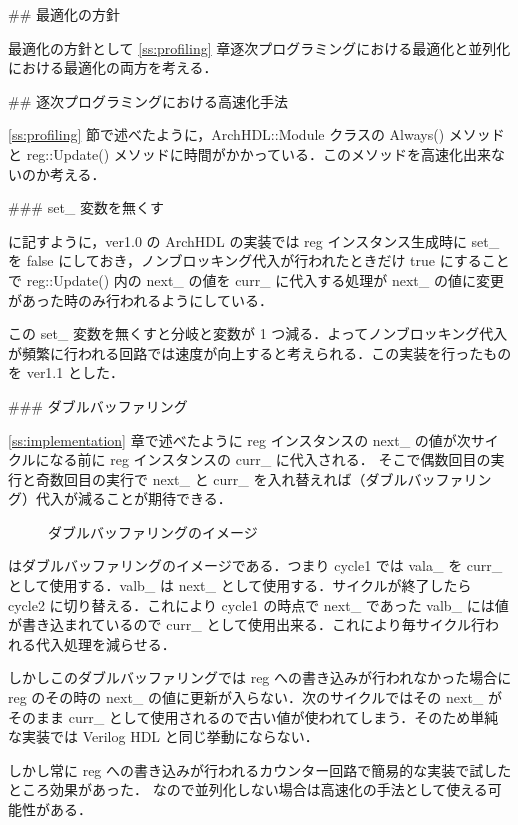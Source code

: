 ## 最適化の方針

最適化の方針として \ref{ss:profiling} 章逐次プログラミングにおける最適化と並列化における最適化の両方を考える．


## 逐次プログラミングにおける高速化手法

\ref{ss:profiling} 節で述べたように，ArchHDL::Module クラスの Always() メソッドと
reg::Update() メソッドに時間がかかっている．このメソッドを高速化出来ないのか考える．


### set_ 変数を無くす \label{s:no_set}

 に記すように，ver1.0 の ArchHDL の実装では reg インスタンス生成時に set_ を false
にしておき，ノンブロッキング代入が行われたときだけ true にすることで
reg::Update() 内の next_ の値を curr_
に代入する処理が next_ の値に変更があった時のみ行われるようにしている．

この set_ 変数を無くすと分岐と変数が 1 つ減る．よってノンブロッキング代入が頻繁に行われる回路では速度が向上すると考えられる．この実装を行ったものを ver1.1 とした．



### ダブルバッファリング

\ref{ss:implementation} 章で述べたように
reg インスタンスの next_ の値が次サイクルになる前に reg インスタンスの curr_ に代入される．
そこで偶数回目の実行と奇数回目の実行で next_ と curr_
を入れ替えれば（ダブルバッファリング）代入が減ることが期待できる．

\begin{figure}[t]
 \begin{center}
  
 \end{center}
 \caption{ダブルバッファリングのイメージ}
 \label{fig:double_buffer}
\end{figure}

 はダブルバッファリングのイメージである．つまり cycle1 では vala_ を curr_ として使用する．valb_ は next_ として使用する．サイクルが終了したら cycle2 に切り替える．これにより cycle1 の時点で next_ であった valb_ には値が書き込まれているので curr_ として使用出来る．これにより毎サイクル行われる代入処理を減らせる．

しかしこのダブルバッファリングでは reg への書き込みが行われなかった場合に
reg のその時の next_ の値に更新が入らない．次のサイクルではその next_ がそのまま
curr_ として使用されるので古い値が使われてしまう．そのため単純な実装では Verilog HDL と同じ挙動にならない．

しかし常に reg への書き込みが行われるカウンター回路で簡易的な実装で試したところ効果があった．
なので並列化しない場合は高速化の手法として使える可能性がある．

